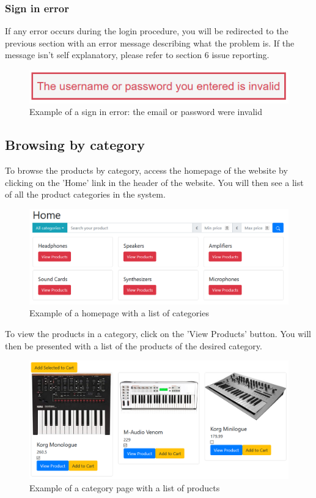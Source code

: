 \subsubsection{Sign in error}
If any error occurs during the login procedure, you will be redirected to the previous section with an error message describing what the problem is. If the message isn't self explanatory, please refer to section 6 issue reporting.

\begin{figure}[H]
\centering
\includegraphics[scale=0.6]{res/Immagini/SigninError}
\caption{Example of a sign in error: the email or password were invalid}
\end{figure}

\subsection{Browsing by category}
To browse the products by category, access the homepage of the website by clicking on the 'Home' link in the header of the website. You will then see a list of all the product categories in the system.

\begin{figure}[H]
\centering
\includegraphics[scale=0.6]{res/Immagini/CategoryList}
\caption{Example of a homepage with a list of categories}
\end{figure}

To view the products in a category, click on the 'View Products' button. You will then be presented with a list of the products of the desired category.

\begin{figure}[H]
\centering
\includegraphics[scale=0.6]{res/Immagini/CategoryPage}
\caption{Example of a category page with a list of products}
\end{figure}

